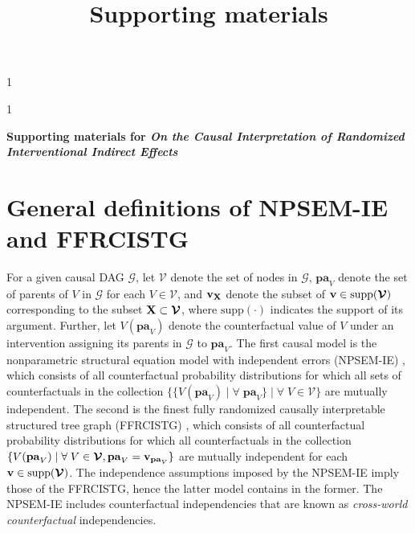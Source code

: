 \documentclass[12pt]{article}
\newcommand{\blind}{1}
\begin{document}
%

\def\spacingset#1{\renewcommand{\baselinestretch}%
{#1}\small\normalsize} \spacingset{1}



\blind { \title{Supporting materials}%
\date{}
    \maketitle
} \fi

\blind
{
  \bigskip
  \bigskip
  \bigskip
  \begin{center}
    {\LARGE\bf Supporting materials for \emph{On the Causal Interpretation of Randomized Interventional Indirect Effects}}
\end{center}
  \medskip
} \fi

\spacingset{1.5} %

\section{General definitions of NPSEM-IE and FFRCISTG}
For a given causal DAG $\mathcal{G}$, let $\boldsymbol{\mathcal{V}}$ denote the set of nodes in $\mathcal{G}$, $\mathbf{pa}_{V}$ denote the set of parents of $V$ in $\mathcal{G}$ for each $V\in\boldsymbol{\mathcal{V}}$, and ${\bf v}_{\bf X}$ denote the subset of $\bf v\in \text{supp}(\boldsymbol{\mathcal{V}})$ corresponding to the subset $\bf X\subset \boldsymbol{\mathcal{V}}$, where $\text{supp}(\cdot)$ indicates the support of its argument. Further, let $V({\mathbf{pa}}_{V})$ denote the counterfactual value of $V$ under an intervention assigning its parents in $\mathcal{G}$ to ${\mathbf{pa}}_{V}$. The first causal model is the nonparametric structural equation model with independent errors (NPSEM-IE) \citep{pearl1995causal}, %
which consists of all counterfactual probability distributions for which all sets of counterfactuals in the collection $\{\{V({\mathbf{pa}}_{V})\mid \forall \; {\mathbf{pa}}_{V}\}\mid \forall \; V\in\boldsymbol{\mathcal{V}}\}$ are mutually independent. The second is the finest fully randomized causally interpretable structured tree graph (FFRCISTG) \citep{robins1986new}, which consists of all counterfactual probability distributions for which all counterfactuals in the collection $\{V({\mathbf{pa}}_{V})\mid \forall \; V\in\boldsymbol{\mathcal{V}}, {\mathbf{pa}}_{V}={\bf v}_{{\mathbf{pa}}_{V}}\}$ are mutually independent for each ${\bf v}\in\text{supp}(\boldsymbol{\mathcal{V}})$. The independence assumptions imposed by the NPSEM-IE imply those of the FFRCISTG, hence the latter model contains in the former. The NPSEM-IE includes counterfactual independencies that are known as \emph{cross-world counterfactual} independencies.
\end{document}
